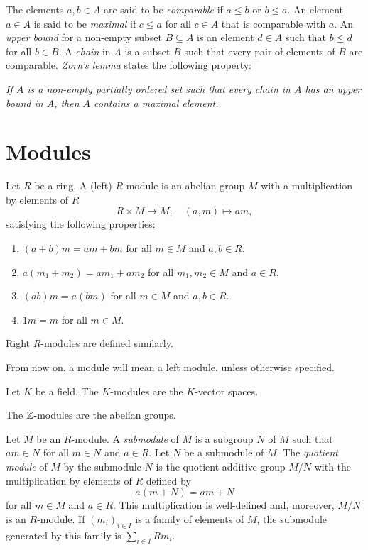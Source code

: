 The elements $a,b\in A$ are said to be {\em comparable} if $a\leq b$ or $b\leq
a$. An element $a\in A$ is said to be {\em maximal} if 
$c\leq a$ 
for all $c\in A$
that is comparable with $a$. 
An {\em upper bound} for a non-empty subset $B\subseteq A$ is an element $d\in
A$ such that $b\leq d$ for all $b\in B$. A {\em chain} in $A$ is a subset 
$B$ such that every pair of elements of $B$ are comparable. 
{\em Zorn's lemma} states the following property: 
\medskip

{\em If $A$ is a non-empty partially ordered set such that every chain in 
	$A$ has an upper bound in $A$, then $A$ contains a maximal element.} 

\section{Modules}

Let $R$ be a ring. A (left) $R$-module is an abelian group $M$ with a multiplication by elements of $R$
\[
R\times M\to M,\quad
(a,m)\mapsto am,
\]
satisfying the following properties:
\begin{enumerate}
	\item $(a+b)m=am+bm$ for all $m\in M$ and $a,b\in R$. 
    \item $a(m_1+m_2)=am_1+am_2$ for all $m_1,m_2\in M$ and $a\in R$.
    \item $(ab)m=a(bm)$ for all $m\in M$ and $a,b\in R$.
    \item $1m=m$ for all $m\in M$.
\end{enumerate}

Right $R$-modules are defined similarly.

\begin{convention}
From now on, a module will mean a left module, unless otherwise specified. 
\end{convention}

\begin{example}
	Let $K$ be a field. The  $K$-modules are the $K$-vector spaces.
\end{example}

\begin{example}
    The $\mathbb{Z}$-modules are the abelian groups.
\end{example}


Let $M$ be an $R$-module. A {\em submodule} of $M$ is a subgroup $N$ of $M$
such that $am\in N$ for all $m\in N$ and $a\in R$. Let $N$ be a submodule of $M$. 
The {\em quotient module} 
of $M$ by the submodule $N$ is
the quotient additive group $M/N$ with the multiplication by elements of $R$ defined by
\[
a(m+N)=am+N
\]
for all $m\in M$ and $a\in R$.
This multiplication is well-defined and, moreover, 
$M/N$ is an $R$-module. If $(m_i)_{i\in I}$ is a family of elements of $M$, 
the submodule generated by this family is 
$\sum_{i \in I}Rm_i$.

